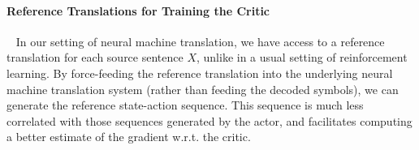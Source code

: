 
\paragraph{Reference Translations for Training the Critic}~
In our setting of neural machine translation, we have access to a reference translation for each source sentence $X$, unlike in a usual setting of reinforcement learning. By force-feeding the reference translation into the underlying neural machine translation system (rather than feeding the decoded symbols), we can generate the reference state-action sequence. This sequence is much less correlated with those sequences generated by the actor, and facilitates computing a better estimate of the gradient w.r.t. the critic. 


